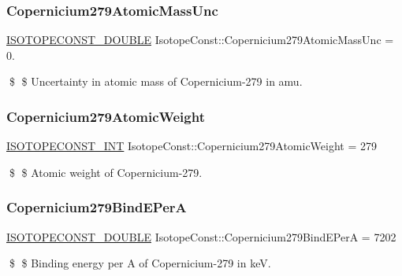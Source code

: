 \subsubsection{\texorpdfstring{Copernicium279\+Atomic\+Mass\+Unc}{Copernicium279AtomicMassUnc}}
{\footnotesize\ttfamily \mbox{\hyperlink{group___isotope_const-_macros_ga8f45a7272ce02c0b4c65c44636ed719a}{I\+S\+O\+T\+O\+P\+E\+C\+O\+N\+S\+T\+\_\+\+D\+O\+U\+B\+LE}} Isotope\+Const\+::\+Copernicium279\+Atomic\+Mass\+Unc = 0.}

\$ \$ Uncertainty in atomic mass of Copernicium-\/279 in amu. \mbox{\label{group___isotope_const-_copernicium-_cn279_ga9401222b2ee32d43c5abd32848050cd4}} 
\subsubsection{\texorpdfstring{Copernicium279\+Atomic\+Weight}{Copernicium279AtomicWeight}}
{\footnotesize\ttfamily \mbox{\hyperlink{group___isotope_const-_macros_ga5f18360b3e99483a35c32d789e62621c}{I\+S\+O\+T\+O\+P\+E\+C\+O\+N\+S\+T\+\_\+\+I\+NT}} Isotope\+Const\+::\+Copernicium279\+Atomic\+Weight = 279}

\$ \$ Atomic weight of Copernicium-\/279. \mbox{\label{group___isotope_const-_copernicium-_cn279_gaf5fe4207a96119d5c1da84387195aa18}} 
\subsubsection{\texorpdfstring{Copernicium279\+Bind\+E\+PerA}{Copernicium279BindEPerA}}
{\footnotesize\ttfamily \mbox{\hyperlink{group___isotope_const-_macros_ga8f45a7272ce02c0b4c65c44636ed719a}{I\+S\+O\+T\+O\+P\+E\+C\+O\+N\+S\+T\+\_\+\+D\+O\+U\+B\+LE}} Isotope\+Const\+::\+Copernicium279\+Bind\+E\+PerA = 7202}

\$ \$ Binding energy per A of Copernicium-\/279 in keV. \mbox{\label{group___isotope_const-_copernicium-_cn279_gae1fce1c164b1723924e07fc89c03e323}} 
